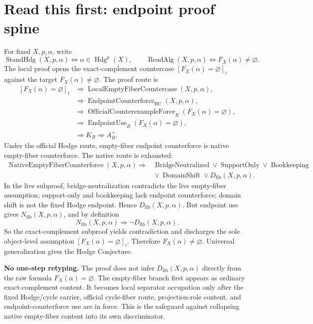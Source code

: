 \documentclass[11pt]{article}
\newcommand{\Hdg}{\operatorname{Hdg}}
\newcommand{\HC}{\operatorname{HC}}
\newcommand{\EndpointUse}{\operatorname{EndpointUse}}
\newcommand{\OfficialCounterexampleForce}{\operatorname{OfficialCounterexampleForce}}
\newcommand{\ReadAlg}{\operatorname{ReadAlg}}
\newcommand{\StandHdg}{\operatorname{StandHdg}}
\begin{document}
\section{Read this first: endpoint proof spine}


For fixed $X,p,\alpha$, write
\[
\StandHdg(X,p,\alpha)\Longleftrightarrow \alpha\in\Hdg^p(X),\qquad
\ReadAlg(X,p,\alpha)\Longleftrightarrow F_X(\alpha)\neq\varnothing.
\]
The local proof opens the exact-complement countercase $[F_X(\alpha)=\varnothing]_i$ against the target $F_X(\alpha)\neq\varnothing$. The proof route is
\[
\begin{aligned}
[F_X(\alpha)=\varnothing]_i&\Rightarrow \operatorname{LocalEmptyFiberCountercase}(X,p,\alpha),\\
&\Rightarrow \operatorname{EndpointCounterforce}_{\HC}(X,p,\alpha),\\
&\Rightarrow \OfficialCounterexampleForce_R(F_X(\alpha)=\varnothing),\\
&\Rightarrow \EndpointUse_R(F_X(\alpha)=\varnothing),\\
&\Rightarrow K_R\Rightarrow A^+_R.
\end{aligned}
\]
Under the official Hodge route, empty-fiber endpoint counterforce is native empty-fiber counterforce. The native route is exhausted:
\[
\begin{aligned}
\operatorname{NativeEmptyFiberCounterforce}(X,p,\alpha)\Rightarrow{}&
\operatorname{BridgeNeutralized}
\vee \operatorname{SupportOnly}\vee \operatorname{Bookkeeping}\\
&{}\vee \operatorname{DomainShift}\vee D_{\mathrm{fib}}(X,p,\alpha).
\end{aligned}
\]
In the live subproof, bridge-neutralization contradicts the live empty-fiber assumption; support-only and bookkeeping lack endpoint counterforce; domain shift is not the fixed Hodge endpoint. Hence $D_{\mathrm{fib}}(X,p,\alpha)$. But endpoint use gives $N_{\mathrm{fib}}(X,p,\alpha)$, and by definition
\[
N_{\mathrm{fib}}(X,p,\alpha)\Rightarrow \neg D_{\mathrm{fib}}(X,p,\alpha).
\]
So the exact-complement subproof yields contradiction and discharges the sole object-level assumption $[F_X(\alpha)=\varnothing]_i$. Therefore $F_X(\alpha)\neq\varnothing$. Universal generalization gives the Hodge Conjecture.

\par\noindent\textbf{No one-step retyping.} The proof does not infer $D_{\mathrm{fib}}(X,p,\alpha)$ directly from the raw formula $F_X(\alpha)=\varnothing$.  The empty-fiber branch first appears as ordinary exact-complement content.  It becomes local separator occupation only after the fixed Hodge/cycle carrier, official cycle-fiber route, projection-role content, and endpoint-counterforce use are in force.  This is the safeguard against collapsing native empty-fiber content into its own discriminator.
\end{document}
